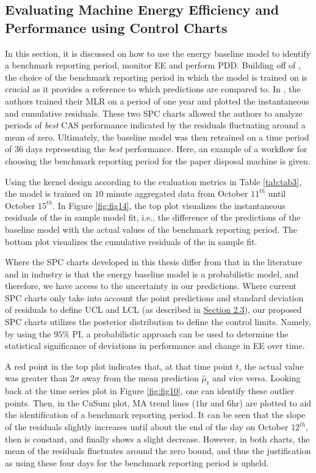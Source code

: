 \subsection{Evaluating Machine Energy Efficiency and Performance using Control Charts}

In this section, it is discussed on how to use the energy baseline model to identify a benchmark reporting period, monitor EE and perform PDD. Building off of \cite{oakland_statistical_2008}, the choice of the benchmark reporting period in which the model is trained on is crucial as it provides a reference to which predictions are compared to. In \cite{cas}, the authors trained their MLR on a period of one year and plotted the instantaneous and cumulative residuals. These two SPC charts allowed the authors to analyze periods of \textit{best} CAS performance indicated by the residuals fluctuating around a mean of zero. Ultimately, the baseline model was then retrained on a time period of $36$ days representing the \textit{best} performance. Here, an example of a workflow for choosing the benchmark reporting period for the paper disposal machine is given.

Using the kernel design according to the evaluation metrics in Table \ref{tab:tab3}, the model is trained on $10$ minute aggregated data from October $11^{th}$ until October $15^{th}$. In Figure \ref{fig:fig14}, the top plot visualizes the instantaneous residuals of the in sample model fit, i.e., the difference of the predictions of the baseline model with the actual values of the benchmark reporting period. The bottom plot visualizes the cumulative residuals of the in sample fit. 

Where the SPC charts developed in this thesis differ from that in the literature and in industry is that the energy baseline model is a probabilistic model, and therefore, we have access to the uncertainty in our predictions. Where current SPC charts only take into account the point predictions and standard deviation of residuals to define UCL and LCL (as described in \hyperlink{subsection.2.3}{Section 2.3}), our proposed SPC charts utilizes the posterior distribution to define the control limits. Namely, by using the $95\%$ PI, a probabilistic approach can be used to determine the statistical significance of deviations in performance and change in EE over time. 

A red point in the top plot indicates that, at that time point $t$, the actual value was greater than $2 \sigma$ away from the mean prediction $\hat{\mu}_t$ and vice versa. Looking back at the time series plot in Figure \ref{fig:fig10}, one can identify these outlier points. Then, in the CuSum plot, MA trend lines ($1$hr and $6$hr) are plotted to aid the identification of a benchmark reporting period. It can be seen that the slope of the residuals slightly increases until about the end of the day on October $12^{th}$, then is constant, and finally shows a slight decrease. However, in both charts, the mean of the residuals fluctuates around the zero bound, and thus the justification as using these four days for the benchmark reporting period is upheld.

